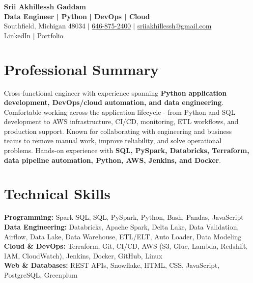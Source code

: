 \documentclass[letterpaper,10pt]{article}
\begin{document}
\fontsize{9.35pt}{10.45pt}\selectfont

\begin{center}
    {\LARGE \textbf{Srii Akhillessh Gaddam}} \\[-1pt]
    \textbf{Data Engineer | Python | DevOps | Cloud} \\[2pt]
    Southfield, Michigan 48034 $|$
    \href{tel:6468752400}{646-875-2400} $|$
    \href{mailto:sriiakhillessh@gmail.com}{sriiakhillessh@gmail.com} \\[1pt]
    \href{https://www.linkedin.com/in/srii-akhiilessh-gaddam-b48668191/}{LinkedIn} $|$
    \href{https://sriiakhillesshg.github.io/portfolio/}{Portfolio}
\end{center}
\vspace{-8pt}

\section{Professional Summary}
\small{Cross-functional engineer with experience spanning \textbf{Python application development, DevOps/cloud automation, and data engineering}. Comfortable working across the application lifecycle - from Python and SQL development to AWS infrastructure, CI/CD, monitoring, ETL workflows, and production support. Known for collaborating with engineering and business teams to remove manual work, improve reliability, and solve operational problems. Hands-on experience with \textbf{SQL, PySpark, Databricks, Terraform, data pipeline automation, Python, AWS, Jenkins, and Docker}.}

\section{Technical Skills}
\small{
\textbf{Programming:} Spark SQL, SQL, PySpark, Python, Bash, Pandas, JavaScript \\
\textbf{Data Engineering:} Databricks, Apache Spark, Delta Lake, Data Validation, Airflow, Data Lake, Data Warehouse, ETL/ELT, Auto Loader, Data Modeling \\
\textbf{Cloud \& DevOps:} Terraform, Git, CI/CD, AWS (S3, Glue, Lambda, Redshift, IAM, CloudWatch), Jenkins, Docker, GitHub, Linux \\
\textbf{Web \& Databases:} REST APIs, Snowflake, HTML, CSS, JavaScript, PostgreSQL, Greenplum
}
\end{document}
